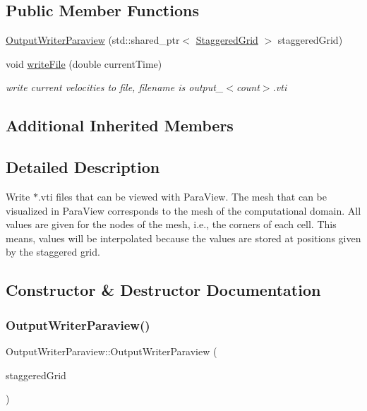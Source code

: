 \subsection*{Public Member Functions}
\begin{DoxyCompactItemize}
\item 
\mbox{\hyperlink{classOutputWriterParaview_ab2931303e3b36323f1233c35ce11c62c}{Output\+Writer\+Paraview}} (std\+::shared\+\_\+ptr$<$ \mbox{\hyperlink{classStaggeredGrid}{Staggered\+Grid}} $>$ staggered\+Grid)
\item 
void \mbox{\hyperlink{classOutputWriterParaview_a9e203b63d0e2f26ad53d18ee1821c6bb}{write\+File}} (double current\+Time)
\begin{DoxyCompactList}\small\item\em write current velocities to file, filename is output\+\_\+$<$count$>$.\+vti \end{DoxyCompactList}\end{DoxyCompactItemize}
\subsection*{Additional Inherited Members}


\subsection{Detailed Description}
Write $\ast$.vti files that can be viewed with Para\+View. The mesh that can be visualized in Para\+View corresponds to the mesh of the computational domain. All values are given for the nodes of the mesh, i.\+e., the corners of each cell. This means, values will be interpolated because the values are stored at positions given by the staggered grid. 

\subsection{Constructor \& Destructor Documentation}
\mbox{\label{classOutputWriterParaview_ab2931303e3b36323f1233c35ce11c62c}} 
\subsubsection{\texorpdfstring{OutputWriterParaview()}{OutputWriterParaview()}}
{\footnotesize\ttfamily Output\+Writer\+Paraview\+::\+Output\+Writer\+Paraview (\begin{DoxyParamCaption}\item[{std\+::shared\+\_\+ptr$<$ \mbox{\hyperlink{classStaggeredGrid}{Staggered\+Grid}} $>$}]{staggered\+Grid }\end{DoxyParamCaption})}

